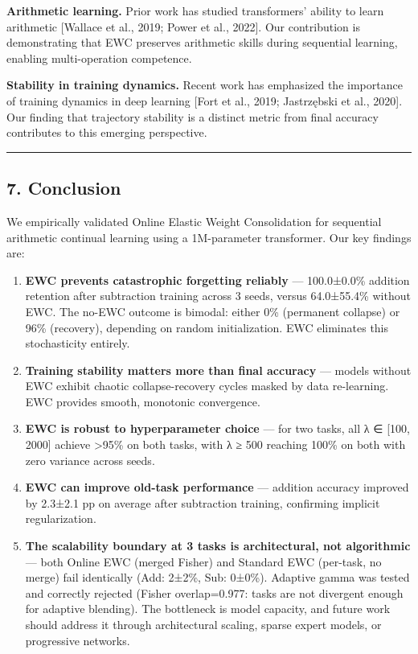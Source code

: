 \documentclass[
]{article}
\begin{document}
\textbf{Arithmetic learning.} Prior work has studied transformers'
ability to learn arithmetic {[}Wallace et al., 2019; Power et al.,
2022{]}. Our contribution is demonstrating that EWC preserves arithmetic
skills during sequential learning, enabling multi-operation competence.

\textbf{Stability in training dynamics.} Recent work has emphasized the
importance of training dynamics in deep learning {[}Fort et al., 2019;
Jastrzębski et al., 2020{]}. Our finding that trajectory stability is a
distinct metric from final accuracy contributes to this emerging
perspective.

\begin{center}\rule{0.5\linewidth}{0.5pt}\end{center}

\subsection{7. Conclusion}\label{conclusion}

We empirically validated Online Elastic Weight Consolidation for
sequential arithmetic continual learning using a 1M-parameter
transformer. Our key findings are:

\begin{enumerate}
\def\labelenumi{\arabic{enumi}.}
\item
  \textbf{EWC prevents catastrophic forgetting reliably} --- 100.0±0.0\%
  addition retention after subtraction training across 3 seeds, versus
  64.0±55.4\% without EWC. The no-EWC outcome is bimodal: either 0\%
  (permanent collapse) or 96\% (recovery), depending on random
  initialization. EWC eliminates this stochasticity entirely.
\item
  \textbf{Training stability matters more than final accuracy} ---
  models without EWC exhibit chaotic collapse-recovery cycles masked by
  data re-learning. EWC provides smooth, monotonic convergence.
\item
  \textbf{EWC is robust to hyperparameter choice} --- for two tasks, all
  λ ∈ {[}100, 2000{]} achieve \textgreater95\% on both tasks, with λ ≥
  500 reaching 100\% on both with zero variance across seeds.
\item
  \textbf{EWC can improve old-task performance} --- addition accuracy
  improved by 2.3±2.1 pp on average after subtraction training,
  confirming implicit regularization.
\item
  \textbf{The scalability boundary at 3 tasks is architectural, not
  algorithmic} --- both Online EWC (merged Fisher) and Standard EWC
  (per-task, no merge) fail identically (Add: 2±2\%, Sub: 0±0\%).
  Adaptive gamma was tested and correctly rejected (Fisher
  overlap=0.977: tasks are not divergent enough for adaptive blending).
  The bottleneck is model capacity, and future work should address it
  through architectural scaling, sparse expert models, or progressive
  networks.
\end{enumerate}
\end{document}
